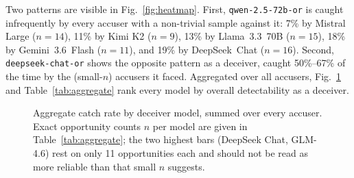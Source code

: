 \documentclass[10pt,conference]{IEEEtran}
\begin{document}
Two patterns are visible in Fig.~\ref{fig:heatmap}. First, \texttt{qwen-2.5-72b-or} is caught infrequently by every accuser with a non-trivial sample against it: 7\% by Mistral Large ($n{=}14$), 11\% by Kimi K2 ($n{=}9$), 13\% by Llama~3.3~70B ($n{=}15$), 18\% by Gemini~3.6~Flash ($n{=}11$), and 19\% by DeepSeek~Chat ($n{=}16$). Second, \texttt{deepseek-chat-or} shows the opposite pattern as a deceiver, caught 50\%--67\% of the time by the (small-$n$) accusers it faced. Aggregated over all accusers, Fig.~\ref{fig:barchart} and Table~\ref{tab:aggregate} rank every model by overall detectability as a deceiver.

\begin{figure}[t]
\centering
{}
\caption{Aggregate catch rate by deceiver model, summed over every accuser. Exact opportunity counts $n$ per model are given in Table~\ref{tab:aggregate}; the two highest bars (DeepSeek Chat, GLM-4.6) rest on only 11 opportunities each and should not be read as more reliable than that small $n$ suggests.}
\label{fig:barchart}
\end{figure}
\end{document}
